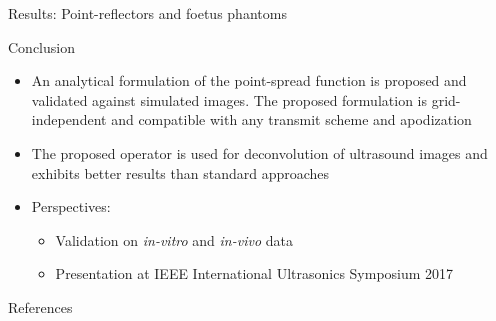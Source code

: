 {\begin{block}{Results: Point-reflectors and foetus phantoms}
\end{block}
\vfill


\begin{block}{Conclusion}
	\begin{itemize}
		\item An analytical formulation of the point-spread function is proposed and validated against simulated images. The proposed formulation is grid-independent and compatible with any transmit scheme and apodization
		\item The proposed operator is used for deconvolution of ultrasound images and exhibits better results than standard approaches
		\item Perspectives:
		\begin{itemize}
			\item Validation on \textit{in-vitro} and \textit{in-vivo} data
			\item Presentation at IEEE International Ultrasonics Symposium 2017~\cite{Roquette_IUS_2017}
		\end{itemize}
	\end{itemize}
\end{block}
\vfill


\begin{block}{References}
	\printbibliography
\end{block}
}